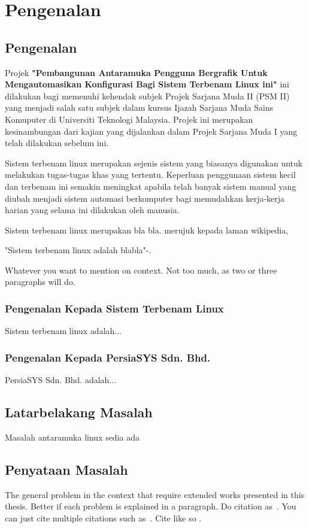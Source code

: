 \chapter{Pengenalan}\label{c1}%

\section{Pengenalan}
Projek \textbf{"Pembangunan Antaramuka Pengguna Bergrafik Untuk Mengautomasikan Konfigurasi Bagi Sistem Terbenam Linux ini"} ini dilakukan bagi memenuhi kehendak subjek Projek Sarjana Muda II (PSM II) yang menjadi salah satu subjek dalam kursus Ijazah Sarjana Muda Sains Komuputer di Universiti Teknologi Malaysia. Projek ini merupakan kesinambungan dari kajian yang dijalankan dalam Projek Sarjana Muda I yang telah dilakukan sebelum ini.

Sistem terbenam linux merupakan sejenis sistem yang biasanya digunakan untuk melakukan tugas-tugas khas yang tertentu. Keperluan penggunaan sistem kecil dan terbenam ini semakin meningkat apabila telah banyak sistem manual yang diubah menjadi sistem automasi berkomputer bagi memudahkan kerja-kerja harian yang selama ini dilakukan oleh manusia. 


Sistem terbenam linux merupakan bla bla. merujuk kepada laman wikipedia,

"Sistem terbenam linux adalah blabla"-\cite{w2}.

Whatever you want to mention on context. Not too much, as two or
three paragraphs will do.

\subsection{Pengenalan Kepada Sistem Terbenam Linux}%
Sistem terbenam linux adalah...

\subsection{Pengenalan Kepada PersiaSYS Sdn. Bhd.}%
PersiaSYS Sdn. Bhd. adalah...

\section{Latarbelakang Masalah}
Masalah antaramuka linux sedia ada

\section{Penyataan Masalah}
The general problem in the context that require extended works
presented in this thesis. Better if each problem is explained in a
paragraph. Do citation as~\cite{b1}. You can just cite multiple
citations such as~\cite{j1, c1, w1}. Cite like so \cite{b1}.

